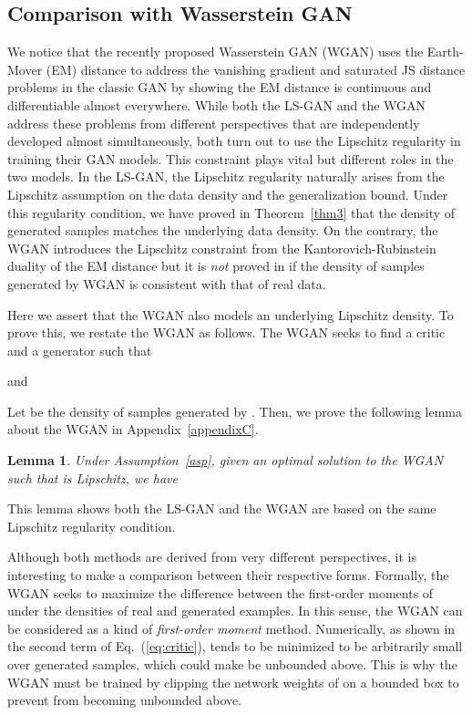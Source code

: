\documentclass[11pt,fullpage, letterpaper,twoside]{article}
\newtheorem{lemma}{Lemma}
\newcommand{\1}[1]{\mathds{1}_{\left[#1\right]}}
\begin{document}
\subsection{Comparison with Wasserstein GAN}\label{sec:wgan}
We notice that the recently proposed Wasserstein GAN (WGAN) \cite{wgan17} uses the Earth-Mover (EM) distance to address the vanishing gradient and saturated JS distance problems in the classic GAN by showing the EM distance is continuous and differentiable almost everywhere.  While both the LS-GAN and the WGAN address these problems from different perspectives that are independently developed almost simultaneously, both turn out to use the Lipschitz regularity in training their GAN models. This constraint plays vital but different roles in the two models.  In the LS-GAN, the Lipschitz regularity naturally arises from the Lipschitz assumption on the data density and the generalization bound. Under this regularity condition, we have proved in Theorem~\ref{thm3} that the density of generated samples matches the underlying data density. On the contrary, the WGAN introduces the Lipschitz constraint from the Kantorovich-Rubinstein duality of the EM distance but it is {\em not} proved in \cite{wgan17} if the density of samples generated by WGAN is consistent with that of real data.

Here we assert that the WGAN also models an underlying Lipschitz density.  To prove this, we restate the WGAN as follows. The WGAN seeks to find a critic  and a generator  such that

and


Let  be the density of samples generated by . Then, we prove the following lemma about the WGAN in Appendix~\ref{appendixC}.

\begin{lemma}\label{lem:wgan}
{Under Assumption~\ref{asp}, given an optimal solution  to the WGAN such that  is Lipschitz, we have
}
\end{lemma}

This lemma shows both the LS-GAN and the WGAN are based on the same Lipschitz regularity condition.

Although both methods are derived from very different perspectives, it is interesting to make a comparison between their respective forms. Formally, the WGAN seeks to maximize the difference between the first-order moments of  under the densities of real and generated examples. In this sense, the WGAN can be considered as a kind of {\em first-order moment} method. Numerically, as shown in the second term of Eq.~(\ref{eq:critic}),  tends to be minimized to be arbitrarily small over generated samples, which could make  be unbounded above. This is why the WGAN must be trained by clipping the network weights of  on a bounded box to prevent  from becoming unbounded above.
\end{document}

